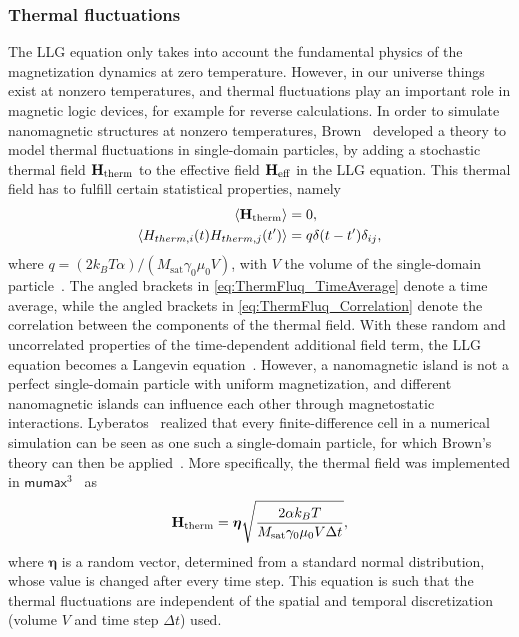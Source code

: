 \documentclass[11pt,a4paper,english,twoside]{article}
\renewcommand{\vec}[1]{\boldsymbol{#1}}
\newcommand{\mumax}{$\mathsf{mumax}^3$}
\begin{document}
\subsubsection{Thermal fluctuations}
The LLG equation only takes into account the fundamental physics of the magnetization dynamics at zero temperature. However, in our universe things exist at nonzero temperatures, and thermal fluctuations play an important role in magnetic logic devices, for example for reverse calculations. In order to simulate nanomagnetic structures at nonzero temperatures, Brown~\cite{ThermFluc_SingleDomain} developed a theory to model thermal fluctuations in single-domain particles, by adding a stochastic thermal field $\vb{H_\mathrm{therm}}$ to the effective field $\vb{H_\mathrm{eff}}$ in the LLG equation. This thermal field has to fulfill certain statistical properties, namely
\begin{align}
    \langle \vb{H_\mathrm{therm}} \rangle &= 0 \mathrm{,} \label{eq:ThermFluq_TimeAverage} \\
    \langle H_{therm,i}(t) H_{therm,j}(t') \rangle &= q \delta(t-t') \delta_{ij} \mathrm{,} \label{eq:ThermFluq_Correlation}
\end{align}
where $q=(2 k_B T \alpha)/(M_\mathrm{sat} \gamma_0 \mu_0 V)$, with $V$ the volume of the single-domain particle~\cite{phd_leliaert}. The angled brackets in \cref{eq:ThermFluq_TimeAverage} denote a time average, while the angled brackets in \cref{eq:ThermFluq_Correlation} denote the correlation between the components of the thermal field. With these random and uncorrelated properties of the time-dependent additional field term, the LLG equation becomes a Langevin equation~\cite{ThermFluc_SingleDomain}. However, a nanomagnetic island is not a perfect single-domain particle with uniform magnetization, and different nanomagnetic islands can influence each other through magnetostatic interactions.
Lyberatos~\cite{Lyberatos_1993} realized that every finite-difference cell in a numerical simulation can be seen as one such a single-domain particle, for which Brown's theory can then be applied~\cite{phd_leliaert}. More specifically, the thermal field was implemented in \mumax{}~\cite{MuMax3,LEL-17b} as
\begin{equation}
    \vb{H_\mathrm{therm}} = \vec{\eta} \sqrt{\frac{2 \alpha k_B T}{M_\mathrm{sat} \gamma_0 \mu_0 V \Delta t}} \mathrm{,}
    \label{eq:H_therm}
\end{equation}
where $\vec{\eta}$ is a random vector, determined from a standard normal distribution, whose value is changed after every time step. This equation is such that the thermal fluctuations are independent of the spatial and temporal discretization (volume $V$ and time step $\Delta t$) used.
\end{document}
